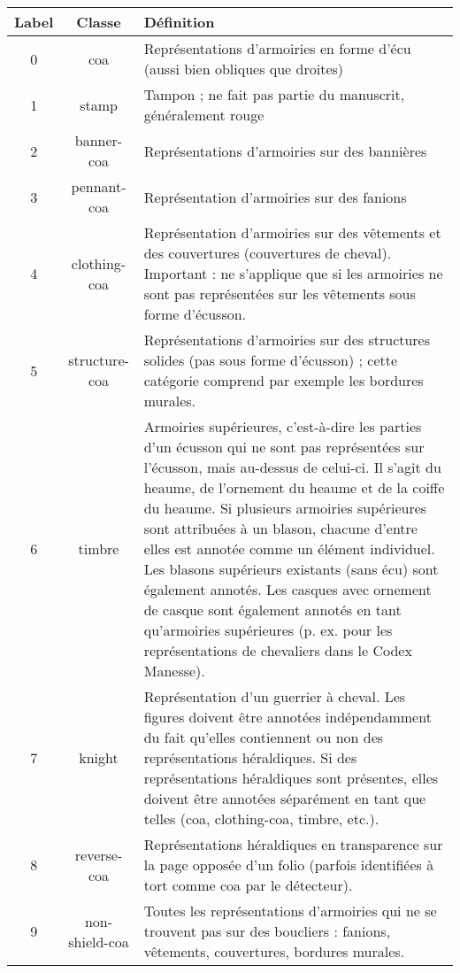 \documentclass[12pt,twoside]{book}
\begin{document}
\begin{center}
\begin{table}
    \begin{tabular}{|c|c|p{12cm}|}
    \hline
    \textbf{Label} & \textbf{Classe} & \textbf{Définition}  \\
    \hline
    0 & coa & Représentations d'armoiries en forme d'écu (aussi bien obliques que droites) \\ 
    \hline
    1 & stamp & Tampon ; ne fait pas partie du manuscrit, généralement rouge \\ 
    \hline
    2 & banner-coa & Représentations d'armoiries sur des bannières \\ 
    \hline
    3 & pennant-coa & Représentation d'armoiries sur des fanions  \\ 
    \hline
    4 & clothing-coa & Représentation d'armoiries sur des vêtements et des couvertures (couvertures de cheval). Important : ne s'applique que si les armoiries ne sont pas représentées sur les vêtements sous forme d'écusson. \\ 
    \hline
    5 & structure-coa & Représentations d'armoiries sur des structures solides (pas sous forme d'écusson) ; cette catégorie comprend par exemple les bordures murales. \\ 
    \hline
    6 & timbre & Armoiries supérieures, c'est-à-dire les parties d'un écusson qui ne sont pas représentées sur l'écusson, mais au-dessus de celui-ci. Il s'agit du heaume, de l'ornement du heaume et de la coiffe du heaume. Si plusieurs armoiries supérieures sont attribuées à un blason, chacune d'entre elles est annotée comme un élément individuel. Les blasons supérieurs existants (sans écu) sont également annotés. Les casques avec ornement de casque sont également annotés en tant qu'armoiries supérieures (p. ex. pour les représentations de chevaliers dans le Codex Manesse).\\ 
    \hline
    7 & knight & Représentation d'un guerrier à cheval. Les figures doivent être annotées indépendamment du fait qu'elles contiennent ou non des représentations héraldiques. Si des représentations héraldiques sont présentes, elles doivent être annotées séparément en tant que telles (coa, clothing-coa, timbre, etc.).\\ 
    \hline
    8 & reverse-coa & Représentations héraldiques en transparence sur la page opposée d'un folio (parfois identifiées à tort comme coa par le détecteur). \\
    \hline
    9 & non-shield-coa & Toutes les représentations d'armoiries qui ne se trouvent pas sur des boucliers : fanions, vêtements, couvertures, bordures murales. \\ 

\end{tabular}
\end{table}
\end{center}
\end{document}
